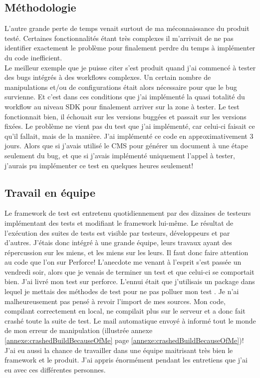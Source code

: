 \subsection{M\'{e}thodologie}
L'autre grande perte de temps venait surtout de ma m\'{e}connaissance du produit test\'{e}. Certaines fonctionnalit\'{e}s \'{e}tant tr\`{e}s complexes il m'arrivait de ne pas identifier exactement le probl\`{e}me pour finalement perdre du temps \`{a} impl\'{e}menter du code inefficient.\\
Le meilleur exemple que je puisse citer s'est produit quand j'ai commenc\'{e} \`{a} tester des bugs int\'{e}gr\'{e}s \`{a} des workflows complexes. Un certain nombre de manipulations et/ou de configurations \'{e}tait alors n\'{e}cessaire pour que le bug survienne. Et c'est dans ces conditions que j'ai impl\'{e}ment\'{e} la quasi totalit\'{e} du workflow au niveau SDK pour finalement arriver sur la zone \`{a} tester. Le test fonctionnait bien, il \'{e}chouait sur les versions bugg\'{e}es et passait sur les versions fix\'{e}es. Le probl\`{e}me ne vient pas du test que j'ai impl\'{e}ment\'{e}, car celui-ci faisait ce qu'il fallait, mais de la mani\`{e}re. J'ai impl\'{e}ment\'{e} ce code en approximativement 3 jours. Alors que si j'avais utilis\'{e} le CMS pour g\'{e}n\'{e}rer un document \`{a} une \'{e}tape seulement du bug, et que si j'avais impl\'{e}ment\'{e} uniquement l'appel \`{a} tester, j'aurais pu impl\'{e}menter ce test en quelques heures seulement!

\subsection{Travail en \'{e}quipe}
Le framework de test est entretenu quotidiennement par des dizaines de testeurs impl\'{e}mentant des tests et modifiant le framework lui-m\^{e}me. Le r\'{e}sultat de l'ex\'{e}cution des suites de tests est visible par testeurs, d\'{e}veloppeurs et par d'autres. J'\'{e}tais donc int\'{e}gr\'{e} \`{a} une grande \'{e}quipe, leurs travaux ayant des r\'{e}percussion sur les miens, et les miens sur les leurs. Il faut donc faire attention au code que l'on  sur Perforce! L'anecdote me venant \`{a} l'esprit s'est pass\'{e}e un vendredi soir, alors que je venais de terminer un test et que celui-ci se comportait bien. J'ai livr\'{e} mon test sur perforce. L'ennui \'{e}tait que j'utilisais un package dans lequel je mettais des m\'{e}thodes de test pour ne pas polluer mon test . Je n'ai malheureusement pas pens\'{e} \`{a} revoir l'import de mes sources. Mon code, compilant correctement en local, ne compilait plus sur le serveur et a donc fait crash\'{e} toute la suite de test. Le mail automatique envoy\'{e} \`{a} inform\'{e} tout le monde de mon erreur de manipulation (illustr\'{e}e annexe \ref{annexe:crashedBuildBecauseOfMe} page \ref{annexe:crashedBuildBecauseOfMe})!\\

J'ai eu aussi la chance de travailler dans une \'{e}quipe maitrisant tr\`{e}s bien le framework et le produit. J'ai appris \'{e}norm\'{e}ment pendant les entretiens que j'ai eu avec ces diff\'{e}rentes personnes.

